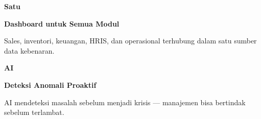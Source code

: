 \documentclass[a4paper]{article}
\begin{document}
\begin{minipage}[t]{0.485\textwidth}
    \noindent\colorbox{BlueBg}{%
        \begin{minipage}[t]{\dimexpr\linewidth-2\fboxsep}
            \vspace{6pt}
            {\fontsize{20}{24}\selectfont\bfseries\color{IndigoPrimary} Satu}\par\vspace{2pt}
            {\fontsize{9.5}{12}\selectfont\bfseries\color{BlueDark} Dashboard untuk Semua Modul}\par\vspace{2pt}
            {\fontsize{8.5}{11}\selectfont\color{TextDark}Sales, inventori, keuangan, HRIS, dan operasional terhubung dalam satu sumber data kebenaran.}%
            \vspace{6pt}
        \end{minipage}}%
    \vspace{6pt}
    \noindent\colorbox{BlueBg}{%
        \begin{minipage}[t]{\dimexpr\linewidth-2\fboxsep}
            \vspace{6pt}
            {\fontsize{20}{24}\selectfont\bfseries\color{IndigoPrimary} AI}\par\vspace{2pt}
            {\fontsize{9.5}{12}\selectfont\bfseries\color{BlueDark} Deteksi Anomali Proaktif}\par\vspace{2pt}
            {\fontsize{8.5}{11}\selectfont\color{TextDark}AI mendeteksi masalah sebelum menjadi krisis --- manajemen bisa bertindak sebelum terlambat.}%
            \vspace{6pt}
        \end{minipage}}%
\end{minipage}

\vspace{8pt}
\end{document}
